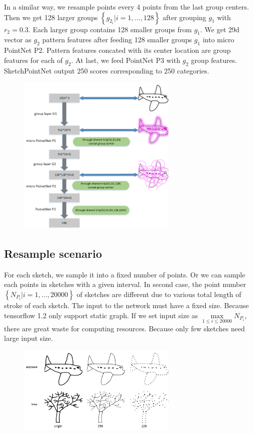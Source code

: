 In a similar way, we resample points every 4 points from the last group centers. Then we get 128 larger groups $\left\{ g_{2_i}| i = 1, ..., 128 \right\}$ after grouping $g_1$ with $r_2 = 0.3$. Each larger group contains 128 smaller groups from $g_1$. We get 29d vector as $g_2$ pattern features after feeding 128 smaller groups $g_1$ into micro PointNet P2. Pattern features concated with its center location are group features for each of $g_2$. At last, we feed PointNet P3 with $g_2$ group features. SketchPointNet output 250 scores corresponding to 250 categories.

\begin{figure}
    \center
    \includegraphics[width=3in]{images/sketchpointnet.png}
    \label{fig:sketchpointnet}
\end{figure}


\subsection{Resample scenario}
\label{ssec:resample_scenario}

For each sketch, we sample it into a fixed number of points. Or we can sample each points in sketches with a given interval. In second case, the point number $\left\{ N_{P_i}| i = 1, ..., 20000 \right\}$ of sketches are different due to various total length of stroke of each sketch. The input to the network must have a fixed size. Because tensorflow 1.2 only support static graph. If we set input size as $\max \limits_{1 \le i \le 20000} N_{P_i}$, there are great waste for computing resources. Because only few sketches need large input size.

\begin{figure}
    \center
    \includegraphics[width=3in]{images/resample2.png}
    \label{fig:resample}
\end{figure}

